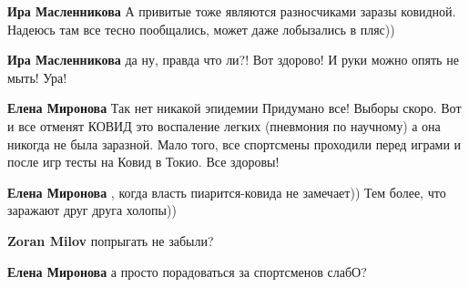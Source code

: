 \begin{itemize}
\begin{itemize}
\textbf{Ира Масленникова} А привитые тоже являются разносчиками заразы ковидной.
Надеюсь там все тесно пообщались, может даже лобызались в пляс))

 
\textbf{Ира Масленникова} да ну, правда что ли?! Вот здорово! И руки можно опять не мыть! Ура!

 
\textbf{Елена Миронова} Так нет никакой эпидемии Придумано все! Выборы скоро. Вот и все отменят КОВИД это воспаление легких (пневмония по научному) а она никогда не была заразной. Мало того, все спортсмены проходили перед играми и после игр тесты на Ковид в Токио. Все здоровы!

 
\textbf{Елена Миронова} , когда власть пиарится-ковида не замечает)) Тем более, что заражают друг друга холопы))

 
\textbf{Zoran Milov} попрыгать не забыли?

 
\textbf{Елена Миронова} а просто порадоваться за спортсменов слабО?

 

\end{itemize}
\end{itemize}
